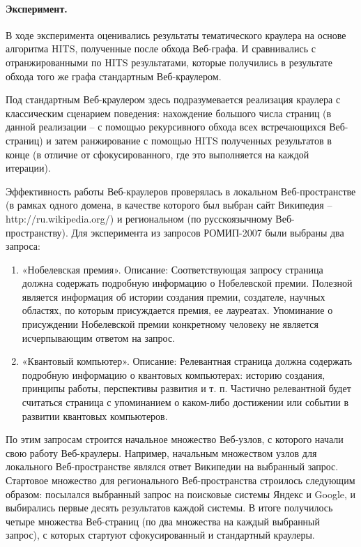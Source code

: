 \paragraph{Эксперимент.} В ходе эксперимента оценивались результаты тематического краулера на основе алгоритма HITS, полученные после обхода Веб-графа. И сравнивались с отранжированными по HITS результатами, которые получились в результате обхода того же графа стандартным Веб-краулером.

Под стандартным Веб-краулером здесь подразумевается реализация краулера с классическим сценарием поведения: нахождение большого числа страниц (в данной реализации -- с помощью рекурсивного обхода всех встречающихся Веб-страниц) и затем ранжирование с помощью HITS полученных результатов в конце (в отличие от сфокусированного, где это выполняется на каждой итерации).

Эффективность работы Веб-краулеров проверялась в локальном Веб-пространстве (в рамках одного домена, в качестве которого был выбран сайт Википедия -- http://ru.wikipedia.org/) и региональном (по русскоязычному Веб-пространству). Для эксперимента из запросов РОМИП-2007 были выбраны два запроса:

\begin{enumerate}
	\item «Нобелевская премия». Описание: Соответствующая запросу страница должна содержать подробную информацию о Нобелевской премии. Полезной является информация об истории создания премии, создателе, научных областях, по которым присуждается премия, ее лауреатах. Упоминание о присуждении Нобелевской премии конкретному человеку не является исчерпывающим ответом на запрос.
	\item «Квантовый компьютер». Описание: Релевантная страница должна содержать подробную информацию о квантовых компьютерах: историю создания, принципы работы, перспективы развития и т. п. Частично релевантной будет считаться страница с упоминанием о каком-либо достижении или событии в развитии квантовых компьютеров.
\end{enumerate}

По этим запросам строится начальное множество Веб-узлов, с которого начали свою работу Веб-краулеры. Например, начальным множеством узлов для локального Веб-пространстве являлся ответ Википедии на выбранный запрос. Стартовое множество для регионального Веб-пространства строилось следующим образом: посылался выбранный запрос на поисковые системы Яндекс и Google, и выбирались первые десять результатов каждой системы. В итоге получилось четыре множества Веб-страниц (по два множества на каждый выбранный запрос), с которых стартуют сфокусированный и стандартный краулеры.

